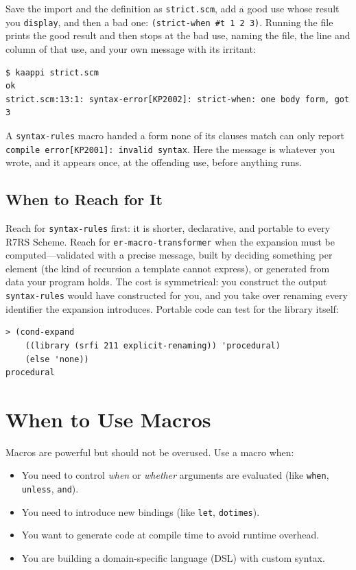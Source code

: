 Save the import and the definition as \texttt{strict.scm}, add a good use whose result you \texttt{display}, and then a bad one: \texttt{(strict-when \#t 1 2 3)}. Running the file prints the good result and then stops at the bad use, naming the file, the line and column of that use, and your own message with its irritant:

\begin{Verbatim}[fontsize=\footnotesize]
$ kaappi strict.scm
ok
strict.scm:13:1: syntax-error[KP2002]: strict-when: one body form, got 3
\end{Verbatim}

A \texttt{syntax-rules} macro handed a form none of its clauses match can only report \texttt{compile error[KP2001]: invalid syntax}. Here the message is whatever you wrote, and it appears once, at the offending use, before anything runs.

\subsection{When to Reach for It}

Reach for \texttt{syntax-rules} first: it is shorter, declarative, and portable to every R7RS Scheme. Reach for \texttt{er-macro-transformer} when the expansion must be computed---validated with a precise message, built by deciding something per element (the kind of recursion a template cannot express), or generated from data your program holds. The cost is symmetrical: you construct the output \texttt{syntax-rules} would have constructed for you, and you take over renaming every identifier the expansion introduces. Portable code can test for the library itself:

\begin{lstlisting}[style=repl]
> (cond-expand
    ((library (srfi 211 explicit-renaming)) 'procedural)
    (else 'none))
procedural
\end{lstlisting}

\section{When to Use Macros}

Macros are powerful but should not be overused. Use a macro when:

\begin{itemize}
    \item You need to control \emph{when} or \emph{whether} arguments are evaluated (like \texttt{when}, \texttt{unless}, \texttt{and}).
    \item You need to introduce new bindings (like \texttt{let}, \texttt{dotimes}).
    \item You want to generate code at compile time to avoid runtime overhead.
    \item You are building a domain-specific language (DSL) with custom syntax.
\end{itemize}

